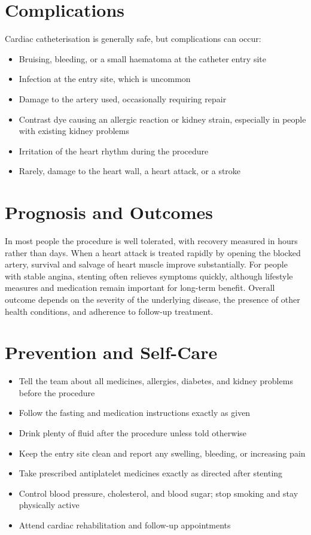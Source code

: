 \section*{Complications}
Cardiac catheterisation is generally safe, but complications can occur:
\begin{itemize}
    \item Bruising, bleeding, or a small haematoma at the catheter entry site
    \item Infection at the entry site, which is uncommon
    \item Damage to the artery used, occasionally requiring repair
    \item Contrast dye causing an allergic reaction or kidney strain, especially in people with existing kidney problems
    \item Irritation of the heart rhythm during the procedure
    \item Rarely, damage to the heart wall, a heart attack, or a stroke
\end{itemize}

\section*{Prognosis and Outcomes}
In most people the procedure is well tolerated, with recovery measured in hours rather than days. When a heart attack is treated rapidly by opening the blocked artery, survival and salvage of heart muscle improve substantially. For people with stable angina, stenting often relieves symptoms quickly, although lifestyle measures and medication remain important for long-term benefit. Overall outcome depends on the severity of the underlying disease, the presence of other health conditions, and adherence to follow-up treatment.

\section*{Prevention and Self-Care}
\begin{itemize}
    \item Tell the team about all medicines, allergies, diabetes, and kidney problems before the procedure
    \item Follow the fasting and medication instructions exactly as given
    \item Drink plenty of fluid after the procedure unless told otherwise
    \item Keep the entry site clean and report any swelling, bleeding, or increasing pain
    \item Take prescribed antiplatelet medicines exactly as directed after stenting
    \item Control blood pressure, cholesterol, and blood sugar; stop smoking and stay physically active
    \item Attend cardiac rehabilitation and follow-up appointments
\end{itemize}

